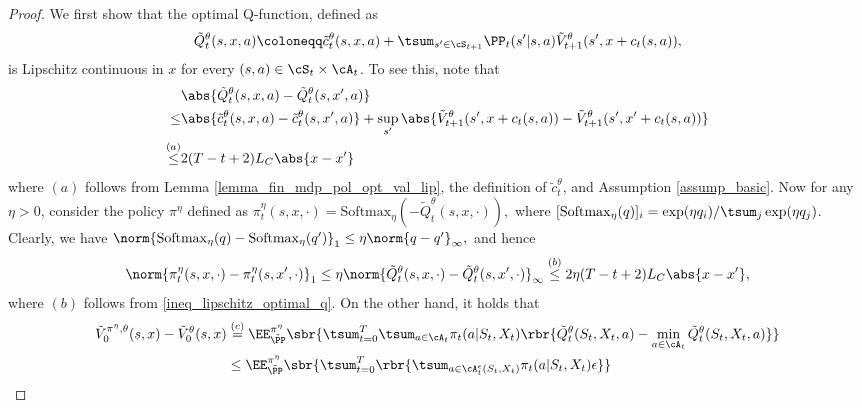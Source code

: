 \documentclass[9pt]{article}
\numberwithin{equation}{section}
\begin{document}
\begin{proof}
We first show that the optimal Q-function, defined as 
\begin{align*}
    \tilde{Q}_t^\theta(s,x,a) \coloneqq \tilde{c}_t^\theta(s, x, a) + \tsum_{s' \in \cS_{t+1}} \PP_t(s' | s, a) \tilde{V}^\theta_{t+1}(s', x + c_t(s, a)),
\end{align*}
is Lipschitz continuous in $x$ for every $(s, a) \in \cS_t \times \cA_t$.
To see this, note that 
\begin{align}\label{ineq_lipschitz_optimal_q}
    & \abs{
    \tilde{Q}_t^\theta(s,x,a) - \tilde{Q}_t^\theta(s,x',a)
    } \nonumber  \\
      \leq &  \abs{
    \tilde{c}_t^\theta(s, x, a) - \tilde{c}_t^\theta(s, x', a)
    }   + \sup_{s'} \abs{
    \tilde{V}^\theta_{t+1}(s', x + c_t(s, a))
    - \tilde{V}^\theta_{t+1}(s', x' + c_t(s, a))
    } \nonumber \\
    \overset{(a)}{\leq}  & 
    2 (T-t+2) L_C \abs{x - x'}
\end{align}
where $(a)$ follows from Lemma \ref{lemma_fin_mdp_pol_opt_val_lip}, the definition of $\tilde{c}_t^\theta$, and Assumption \ref{assump_basic}.
Now for any $\eta >0$, consider the policy $\pi^\eta$ defined as 
$
    \pi_t^\eta(s,x, \cdot) = \mathrm{Softmax}_\eta ({ - \tilde{Q}^\theta_t(s,x, \cdot) }),
$
where $
[\mathrm{Softmax}_\eta (q)]_i = \exp( \eta q_i) /\tsum_{j} \exp( \eta q_j)
$.
Clearly, we have 
$
\norm{\mathrm{Softmax}_\eta (q) - \mathrm{Softmax}_\eta (q')}_1 \leq \eta \norm{q - q'}_\infty,
$
and hence
\begin{align}\label{ineq_approx_opt_policy_lip}
    \norm{\pi_t^\eta(s, x, \cdot) - \pi_t^\eta(s, x', \cdot ) }_1 
    \leq \eta \norm{\tilde{Q}^\theta_t(s,x, \cdot) - \tilde{Q}^\theta_t(s,x', \cdot)}_\infty
    \overset{(b)}{\leq} 2 \eta (T-t+2) L_C \abs{x - x'},
\end{align}
where $(b)$ follows from \eqref{ineq_lipschitz_optimal_q}.
On the other hand, it holds that
\begin{align}
    \tilde{V}^{\pi^\eta, \theta}_0(s,x) -  \tilde{V}^{ \theta}_0(s,x)
    & \overset{(c)}{=} \EE^{\pi^\eta}_{\tilde{\PP}}
    \sbr{
        \tsum_{t=0}^T  \tsum_{a \in \cA_t} \pi_t(a|S_t, X_t)\rbr{  \tilde{Q}_t^\theta (S_t, X_t, a) - \min_{a\in \cA_t} \tilde{Q}_t^\theta(S_t, X_t, a) 
        }
    }  \nonumber \\ 
    & \leq 
     \EE^{\pi^\eta}_{\tilde{\PP}}
    \sbr{
        \tsum_{t=0}^T \rbr{\tsum_{a \in \cA_t^\epsilon(S_t, X_t) } \pi_t(a|S_t, X_t) \epsilon 
}}
\end{align}
\end{proof}
\end{document}
